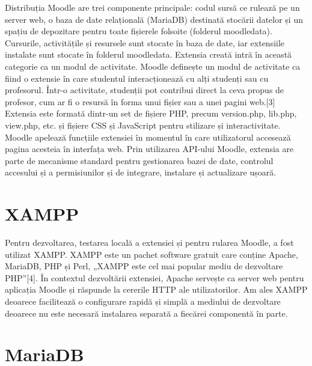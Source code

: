 Distribuția Moodle are trei componente principale: codul sursă ce rulează pe un server web, o baza de date relațională (MariaDB) destinată stocării datelor și un spațiu de depozitare pentru
toate fișierele folsoite (folderul moodledata). Cursurile, activitățile și resursele sunt stocate în baza de date, iar extensiile instalate sunt stocate în folderul moodledata. Extensia 
creată intră în această categorie ca un modul de activitate. Moodle definește un modul de activitate ca fiind o extensie în care studentul interacționează cu alți studenți sau cu 
profesorul. Într-o activitate, studenții pot contribui direct la ceva propus de profesor, cum ar fi o resursă în forma unui fișier sau a unei pagini web.[3] Extensia este formată dintr-un
set de fișiere PHP, precum version.php, lib.php, view.php,  etc. și fișiere CSS și JavaScript pentru stilizare și interactivitate. Moodle apelează funcțiile extensiei în momentul în care
utilizatorul accesează pagina acesteia în interfața web. Prin utilizarea API-ului Moodle, extensia are parte de mecanisme standard pentru gestionarea bazei de date, controlul accesului
și a permisiunilor și de integrare, instalare și actualizare ușoară.

\section{XAMPP}

Pentru dezvoltarea, testarea locală a extensiei și pentru rularea Moodle, a fost utilizat XAMPP. XAMPP este un pachet software gratuit care conține Apache, MariaDB, PHP și 
Perl, „XAMPP este cel mai popular mediu de dezvoltare PHP”[4]. În contextul dezvoltării extensiei, Apache servește ca server web pentru aplicația Moodle și răspunde la cererile HTTP ale
utilizatorilor. Am ales XAMPP deoarece facilitează o configurare rapidă și simplă a mediului de dezvoltare deoarece nu este necesară instalarea separată a fiecărei componentă în parte.

\section{MariaDB}

